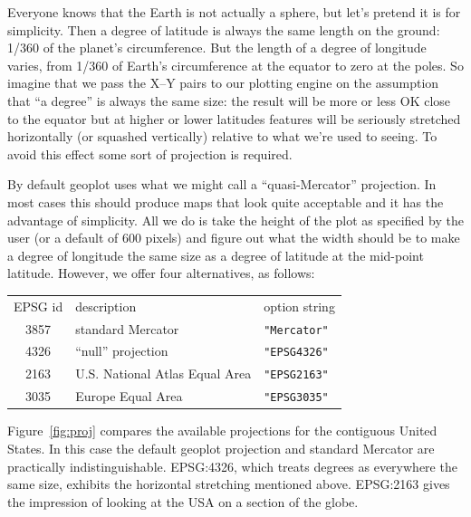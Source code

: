 \documentclass{article}
\begin{document}
Everyone knows that the Earth is not actually a sphere, but let's
pretend it is for simplicity. Then a degree of latitude is always the
same length on the ground: 1/360 of the planet's circumference. But
the length of a degree of longitude varies, from 1/360 of Earth's
circumference at the equator to zero at the poles. So imagine that we
pass the X--Y pairs to our plotting engine on the assumption that ``a
degree'' is always the same size: the result will be more or less OK
close to the equator but at higher or lower latitudes features will be
seriously stretched horizontally (or squashed vertically) relative to
what we're used to seeing. To avoid this effect some sort of
projection is required.

By default geoplot uses what we might call a ``quasi-Mercator''
projection. In most cases this should produce maps that look quite
acceptable and it has the advantage of simplicity. All we do is take
the height of the plot as specified by the user (or a default of 600
pixels) and figure out what the width should be to make a degree of
longitude the same size as a degree of latitude at the mid-point
latitude. However, we offer four alternatives, as follows:
\begin{center}
  \begin{tabular}{cll}
    EPSG id & description & option string \\[4pt]
  \textsf{3857} & standard Mercator & \verb|"Mercator"| \\
  \textsf{4326} & ``null'' projection & \verb|"EPSG4326"| \\
  \textsf{2163} & U.S. National Atlas Equal Area &
     \verb|"EPSG2163"| \\
  \textsf{3035} & Europe Equal Area & \verb|"EPSG3035"|
\end{tabular}
\end{center}

Figure~\ref{fig:proj} compares the available projections for the
contiguous United States. In this case the default \textsf{geoplot}
projection and standard Mercator are practically
indistinguishable. \textsf{EPSG:4326}, which treats degrees as
everywhere the same size, exhibits the horizontal stretching mentioned
above. \textsf{EPSG:2163} gives the impression of looking at the USA
on a section of the globe.
\end{document}
